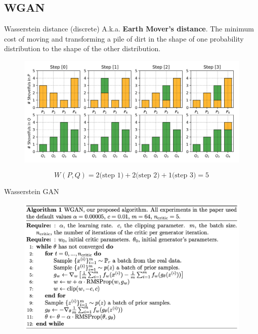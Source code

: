 \documentclass{beamer}
\begin{document}
\subsection{WGAN}
\begin{frame}{Wasserstein distance (discrete)}
	A.k.a. \textbf{Earth Mover's distance}.
	The minimum cost of moving and transforming a pile of dirt in the shape of one probability distribution to the shape of the other distribution.
	\begin{figure}
		\centering
		\includegraphics[width=.9\linewidth]{figs/EM_distance_discrete}
	\end{figure}
	\[
		W(P, Q) = 2 \text{(step 1)} + 2 \text{(step 2)} + 1 \text{(step 3)}  = 5
	\]
\end{frame}
\begin{frame}{Wasserstein GAN}
	\begin{figure}
		\centering
		\includegraphics[width=1.0\linewidth]{figs/wgan_pseudocode}
	\end{figure}

\end{frame}
\end{document}
